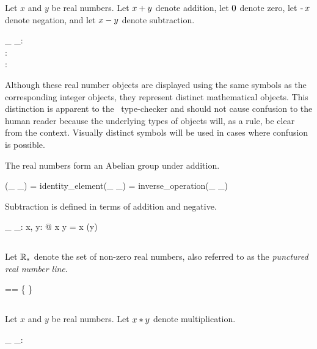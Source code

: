 \documentclass{amsart}
\begin{document}
Let $x$ and $y$ be real numbers.
Let $x \mathbin{+} y$ denote addition,
let $0$ denote zero,
let $\operatorname{-} x$ denote negation,
and let $x \mathbin{-} y$ denote subtraction.

\begin{axdef}
	\_ \addR \_: \R \cross \R \fun \R \\
	\zeroR: \R \\
	\negR: \R \fun \R
\end{axdef}

Although these real number objects are displayed using the same symbols as the corresponding integer objects,
they represent distinct mathematical objects.
This distinction is apparent to the \fuzz\ type-checker and should not cause confusion to the human reader
because the underlying types of objects will, as a rule, be clear from the context.
Visually distinct symbols will be used in cases where confusion is possible.

The real numbers form an Abelian group under addition.

\begin{zed}
(\_ \addR \_) \in \abgroup \R
\also
\zeroR = identity\_element(\_ \addR \_)
\also
\negR = inverse\_operation(\_ \addR \_)
\end{zed}

Subtraction is defined in terms of addition and negative.

\begin{axdef}
	\_ \subR \_: \R \cross \R \fun \R
	\where
	\forall x, y: \R @ x \subR y = x \addR (\negR y)
\end{axdef}

\subsection{}

Let $\mathbb{R}_{*}$ denote the set of non-zero real numbers,
also referred to as the {\it punctured real number line}.

\begin{zed}
	\Rnz == \R \setminus \{ \zeroR \}
\end{zed}

\subsection{}

Let $x$ and $y$ be real numbers.
Let $x \mathbin{*} y$ denote multiplication.

\begin{axdef}
	\_ \mulR \_: \R \cross \R \fun \R
\end{axdef}
\end{document}
